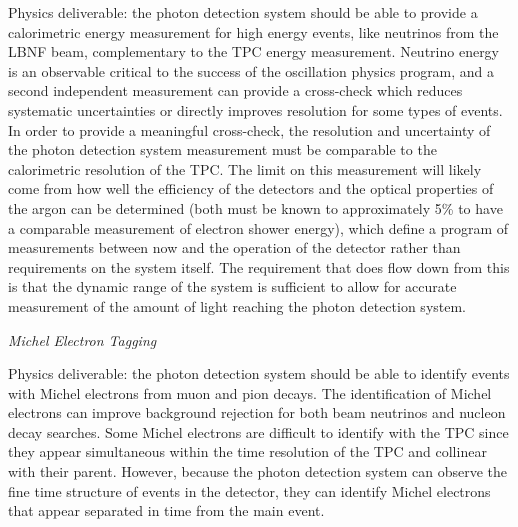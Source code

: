 Physics deliverable: the photon detection system should be able to provide a calorimetric energy measurement for high energy events, like neutrinos from the LBNF beam, complementary to the TPC energy measurement.
Neutrino energy is an observable critical to the success of the oscillation physics program, and a second independent measurement can provide a cross-check which reduces systematic uncertainties or directly improves resolution for some types of events. In order to provide a meaningful cross-check, the resolution and uncertainty of the photon detection system measurement must be comparable to the calorimetric resolution of the TPC. The limit on this measurement will likely come from how well the efficiency of the detectors and the optical properties of the argon can be determined (both must be known to approximately 5\% to have a comparable measurement of electron shower energy), which define a program of measurements between now and the operation of the detector rather than requirements on the system itself. The requirement that does flow down from this is that the dynamic range of the system is sufficient to allow for accurate measurement of the amount of light reaching the photon detection system. 



\textit{\it Michel Electron Tagging}

Physics deliverable: the photon detection system should be able to identify events with Michel electrons from muon and pion decays.
The identification of Michel electrons can improve background rejection for both beam neutrinos and nucleon decay searches. 
Some Michel electrons are difficult to identify with the TPC since they appear simultaneous within the time resolution of the TPC and collinear with their parent. However, because the photon detection system can observe the fine time structure of events in the detector, they can identify Michel electrons that appear separated in time from the main event.



